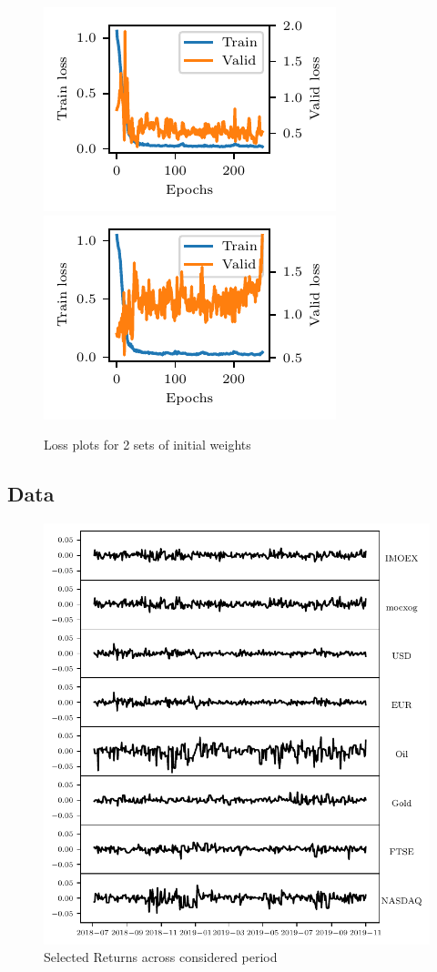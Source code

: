 \documentclass[review, authoryear]{elsarticle}
\begin{document}
\begin{figure}[h]
    \centering
    \includegraphics{good_loss.pdf}
    \includegraphics{bad_loss.pdf}
    \caption{Loss plots for 2 sets of initial weights}
    \label{fig:loss}
\end{figure}

\clearpage
\subsection{Data}

\begin{figure}[h]
	\centering
	\includegraphics{data.pdf}
	\caption{Selected Returns across considered period}
	\label{fig:data}
\end{figure}
\end{document}
